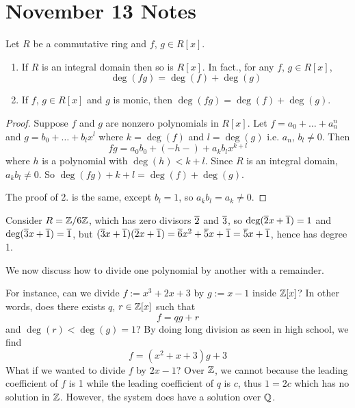 \section{November 13 Notes}

\begin{propbox}
    Let $R$ be a commutative ring and $f$, $g \in R[x]$. 
    \begin{enumerate}
        \item If $R$ is an integral domain then so is $R[x]$. In fact., for any $f$, $g \in R[x]$,
            \[ \deg(fg) = \deg(f) + \deg(g)\]
        \item If $f$, $g \in R[x]$ and $g$ is monic, then $\deg(fg) = \deg(f) + \deg(g)$.
    \end{enumerate}
\end{propbox}

\begin{proof}
    Suppose $f$ and $g$ are nonzero polynomials in $R[x]$. Let $f = a_0 + \dots + a_n^n$ and $g = b_0 + \dots + b_lx^l$ where $k = \deg(f)$ and $l = \deg(g)$ i.e. $a_n$, $b_l \neq 0$. Then 
    \[ fg = a_0b_0 + (-h-) + a_kb_lx^{k+l} \] 
    where $h$ is a polynomial with $\deg(h) < k + l$. Since $R$ is an integral domain, $a_kb_l \neq 0$. So $\deg(fg) + k + l = \deg(f) + \deg(g)$. 

    The proof of 2. is the same, except $b_l = 1$, so $a_kb_l = a_k \neq 0$. 
\end{proof}

\begin{example}
    Consider $R = \mathbb{Z}/6\mathbb{Z}$, which has zero divisors $\overline{2}$ and $\overline{3}$, so $\deg(\overline{2}x+\overline{1}) = 1$ and $\deg(\overline{3}x + \overline{1}) = \overline{1}$, but $(\overline{3}x + \overline{1})(\overline{2}x + \overline{1}) = \overline{6}x^2 + \overline{5}x + \overline{1} = \overline{5}x + \overline{1}$, hence has degree 1.
\end{example}

We now discuss how to divide one polynomial by another with a remainder. 

For instance, can we divide $f := x^3 + 2x + 3$ by $g := x - 1$ inside $\mathbb{Z}[x]$? In other words, does there exists $q$, $r \in \mathbb{Z}[x]$ such that
    \[ f = qg + r \] 
and $\deg(r) < \deg(g) = 1$? By doing long division as seen in high school, we find 
    \[ f = (x^2 + x + 3)g + 3\]
What if we wanted to divide $f$ by $2x - 1$? Over $\mathbb{Z}$, we cannot because the leading coefficient of $f$ is 1 while the leading coefficient of $q$ is $c$, thus $1 = 2c$ which has no solution in $\mathbb{Z}$. However, the system does have a solution over $\mathbb{Q}$. 

